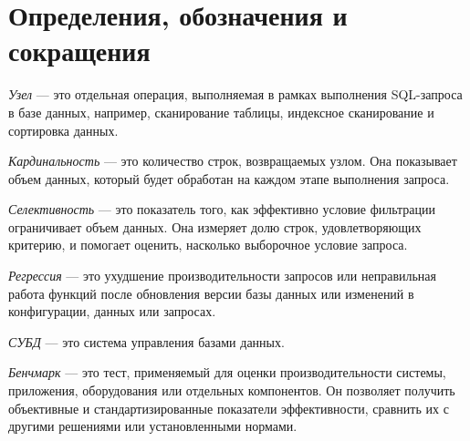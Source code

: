 \chapter*{Определения, обозначения и сокращения}

\newcommand{\customglossaryentry}[2]
{
	\textit{#1} --- #2
}

\customglossaryentry{Узел}{это отдельная операция, выполняемая в рамках выполнения SQL-запроса в базе данных, например, сканирование таблицы, индексное сканирование и сортировка данных.}

\customglossaryentry{Кардинальность}{это количество строк, возвращаемых узлом. Она показывает объем данных, который будет обработан на каждом этапе выполнения запроса.}

\customglossaryentry{Селективность}{это показатель того, как эффективно условие фильтрации ограничивает объем данных. Она измеряет долю строк, удовлетворяющих критерию, и помогает оценить, насколько выборочное условие запроса.}

\customglossaryentry{Регрессия}{это ухудшение производительности запросов или неправильная работа функций после обновления версии базы данных или изменений в конфигурации, данных или запросах.}

\customglossaryentry{СУБД}{это  система управления базами данных.}

\customglossaryentry{Бенчмарк}{это тест, применяемый для оценки производительности системы, приложения, оборудования или отдельных компонентов. Он позволяет получить объективные и стандартизированные показатели эффективности, сравнить их с другими решениями или установленными нормами.}

